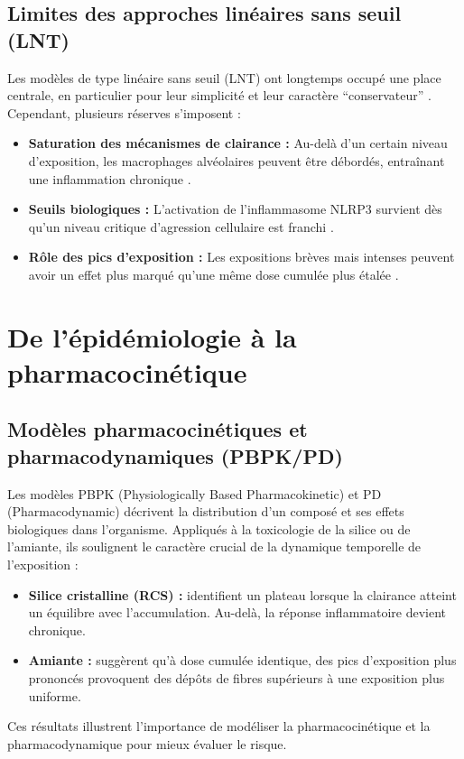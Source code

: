 \subsection{Limites des approches linéaires sans seuil (LNT)}
Les modèles de type linéaire sans seuil (LNT) ont longtemps occupé une place centrale, en particulier pour leur simplicité et leur caractère ``conservateur'' \citep{Belkebir2011,Simmons2005}. Cependant, plusieurs réserves s’imposent :
\begin{itemize}
    \item \textbf{Saturation des mécanismes de clairance :} Au-delà d’un certain niveau d’exposition, les macrophages alvéolaires peuvent être débordés, entraînant une inflammation chronique \citep{Tran2001,DeStefano2017}.
    \item \textbf{Seuils biologiques :} L’activation de l’inflammasome NLRP3 survient dès qu’un niveau critique d’agression cellulaire est franchi \citep{Groslambert2018,Sayan2016}.
    \item \textbf{Rôle des pics d'exposition :} Les expositions brèves mais intenses peuvent avoir un effet plus marqué qu’une même dose cumulée plus étalée \citep{Cox2019}.
\end{itemize}

\section{De l’épidémiologie à la pharmacocinétique}
\subsection{Modèles pharmacocinétiques et pharmacodynamiques (PBPK/PD)}
Les modèles PBPK (Physiologically Based Pharmacokinetic) et PD (Pharmacodynamic) décrivent la distribution d'un composé et ses effets biologiques dans l'organisme. Appliqués à la toxicologie de la silice ou de l'amiante, ils soulignent le caractère crucial de la dynamique temporelle de l'exposition \citep{Tran2001,DeStefano2017} :
\begin{itemize}
    \item \textbf{Silice cristalline (RCS) :} \citet{Tran2001} identifient un plateau lorsque la clairance atteint un équilibre avec l'accumulation. Au-delà, la réponse inflammatoire devient chronique.
    \item \textbf{Amiante :} \citet{DeStefano2017} suggèrent qu’à dose cumulée identique, des pics d’exposition plus prononcés provoquent des dépôts de fibres supérieurs à une exposition plus uniforme.
\end{itemize}
Ces résultats illustrent l'importance de modéliser la pharmacocinétique et la pharmacodynamique pour mieux évaluer le risque.


